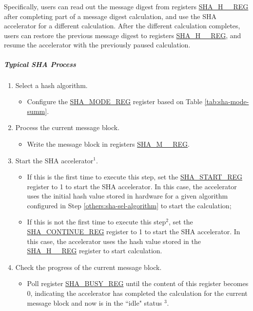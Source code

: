 \documentclass[main\_\_EN.tex]{subfiles}
\begin{document}
Specifically, users can read out the message digest from registers \hyperref[regdesc:SHAHNREG]{SHA\_H\_\_REG} after completing part of a message digest calculation, and use the SHA accelerator for a different calculation. After the different calculation completes, users can restore the previous message digest to registers \hyperref[regdesc:SHAHNREG]{SHA\_H\_\_REG}, and resume the accelerator with the previously paused calculation.

\subparagraph{Typical SHA Process}

\begin{enumerate}
    \item \label{others:sha-sel-algorithm} Select a hash algorithm.
    \begin{itemize}
        \item Configure the \hyperref[regdesc:SHAMODEREG]{SHA\_MODE\_REG} register based on Table \ref{tab:sha-mode-summ}.
    \end{itemize}
    \item \label{others:sha-current-block} Process the current message block.
    \begin{itemize}
        \item Write the message block in registers \hyperref[regdesc:SHAMNREG]{SHA\_M\_\_REG}.
    \end{itemize}
    \item Start the SHA accelerator\hyperref[others:sha-note-typical-sha]{$^1$}.
    \begin{itemize}
        \item If this is the first time to execute this step, set the \hyperref[regdesc:SHASTARTREG]{SHA\_START\_REG} register to 1 to start the SHA accelerator. In this case, the accelerator uses the initial hash value stored in hardware for a given algorithm configured in Step \ref{others:sha-sel-algorithm} to start the calculation;
        \item If this is not the first time to execute this step\hyperref[others:sha-note-typical-sha]{$^2$}, set the \hyperref[regdesc:SHACONTINUEREG]{SHA\_CONTINUE\_REG} register to 1 to start the SHA accelerator. In this case, the accelerator uses the hash value stored in the \hyperref[regdesc:SHAHNREG]{SHA\_H\_\_REG} register to start calculation.
    \end{itemize}
    \item Check the progress of the current message block.
    \begin{itemize}
        \item Poll register \hyperref[regdesc:SHABUSYREG]{SHA\_BUSY\_REG} until the content of this register becomes 0, indicating the accelerator has completed the calculation for the current message block and now is in the ``idle" status \hyperref[others:sha-note-typical-sha]{$^3$}. 
    \end{itemize}
        

\end{enumerate}
\end{document}
